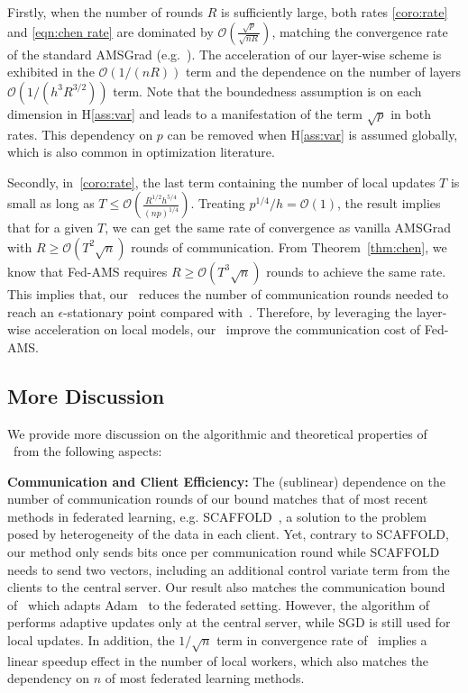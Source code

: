 \documentclass[nohyperref]{article}
\begin{document}
\vspace{0.2in}

Firstly, when the number of rounds $R$ is sufficiently large, both rates \eqref{coro:rate} and \eqref{eqn:chen rate} are dominated by $\mathcal O(\frac{\sqrt p}{\sqrt{n R}})$, matching the convergence rate of the standard AMSGrad (e.g.~\cite{Arxiv:Zhou_18}).
The acceleration of our layer-wise scheme is exhibited in the $\mathcal O(1/(n R))$ term and the dependence on the number of layers $\mathcal O(1/(h^3 R^{3/2}))$ term. Note that the boundedness assumption is on each dimension in H\ref{ass:var} and leads to a manifestation of the term $\sqrt{p}$ in both rates. This dependency on $p$ can be removed when H\ref{ass:var} is assumed globally, which is also common in optimization literature.

Secondly, in~\eqref{coro:rate}, the last term containing the number of local updates $T$ is small as long as $T\leq \mathcal O(\frac{R^{1/2}h^{5/4}}{(np)^{1/4}})$. 
Treating $p^{1/4}/h=\mathcal O(1)$, the result implies that for a given $T$, we can get the same rate of convergence as vanilla AMSGrad with $R\geq \mathcal{O}(T^2\sqrt n)$ rounds of communication. From Theorem~\ref{thm:chen}, we know that Fed-AMS requires $R\geq \mathcal O(T^3\sqrt n)$ rounds to achieve the same rate. This implies that, our \algo\ reduces the number of communication rounds needed to reach an $\epsilon$-stationary point compared with~\cite{chen2020toward}. Therefore, by leveraging the layer-wise acceleration on local models, our \algo\ improve the communication cost of Fed-AMS.


\vspace{0.1in}

\subsection{More Discussion}

We provide more discussion on the algorithmic and theoretical properties of \algo\ from the following aspects:


\vspace{0.1in}
\noindent\textbf{Communication and Client Efficiency:} The (sublinear) dependence on the number of communication rounds of our bound matches that of most recent methods in federated learning, e.g. SCAFFOLD~\citep{karimireddy2019scaffold}, a solution to the problem posed by heterogeneity of the data in each client. Yet, contrary to SCAFFOLD, our method only sends bits once per communication round while SCAFFOLD needs to send two vectors, including an additional control variate term  from the clients to the central server. Our result also matches the communication bound of~\cite{reddi2020adaptive} which adapts Adam~\citep{KB15} to the federated setting. However, the algorithm of~\cite{reddi2020adaptive} performs adaptive updates only at the central server, while SGD is still used for local updates. In addition, the $1/\sqrt n$ term in convergence rate of \algo\ implies a linear speedup effect in the number of local workers, which also matches the dependency on $n$ of most federated learning methods. 
\end{document}
